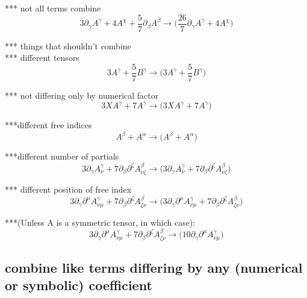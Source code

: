 \documentclass{article}
\def\){\Big)}
\def\({\Big(}
\begin{document}
*** not all terms combine 
\begin{equation}
3\partial_{\gamma}A^{\gamma} + 4 A^{\chi}+ \frac{5}{7} \partial_{\beta}A^{\beta} \rightarrow 
 \(\frac{26}{7} \partial_{\gamma}A^{\gamma} +4 A^{\chi} \)
\end{equation}

*** things that shouldn’t combine\\

*** different tensors
\begin{equation}
3A^{\gamma} + \frac{5}{7} B^{\gamma} \rightarrow  
\(3 A^{\gamma} +\frac{5}{7} B^{\gamma} \)
\end{equation}

*** not differing only by numerical factor
\begin{equation}
3XA^{\gamma} + 7 A^{\gamma}  \rightarrow 
\(3 X A^{\gamma} +7 A^{\gamma} \)
\end{equation}

***different free indices
\begin{equation}
A^{\beta} + A^{\alpha} \rightarrow 
\( A^{\beta} + A^{\alpha} \)
\end{equation}

***different number of partials
\begin{equation}
3\partial_{\gamma}A^{\gamma}_{\nu} + 7 \partial_{\beta}\partial^{\zeta}A^{\beta}_{\nu \zeta} \rightarrow 
\(3 \partial_{\gamma}A_{\nu}^{\gamma} +7 \partial_{\beta}\partial^{\zeta}A_{\nu \zeta}^{\beta} \)
\end{equation}

*** different position of free index
\begin{equation}
3\partial_{\gamma}\partial^{\mu}A^{\gamma}_{\nu \mu} + 7 \partial_{\beta}\partial^{\zeta}A^{\beta}_{\zeta \nu} \rightarrow 
\(3 \partial_{\gamma}\partial^{\mu}A_{\nu \mu}^{\gamma} +7 \partial_{\beta}\partial^{\zeta}A_{\zeta \nu}^{\beta} \)
\end{equation}

***(Unless A is a symmetric tensor, in which case):
\begin{equation}
3\partial_{\gamma}\partial^{\mu}A^{\gamma}_{\nu \mu} + 7 \partial_{\beta}\partial^{\zeta}A^{\beta}_{\zeta \nu} \rightarrow 
\(10 \partial_{\gamma}\partial^{\mu}A_{\nu \mu}^{\gamma} \)
\end{equation}





\subsection{ combine like terms differing by any (numerical or symbolic) coefficient}
\end{document}
